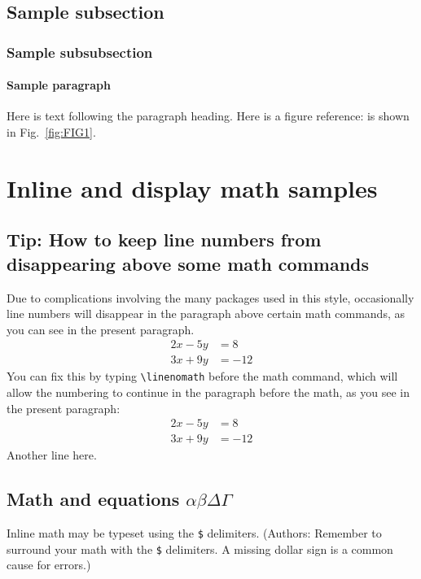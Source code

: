 \documentclass[preprint]{JASA}
\begin{document}
\subsection{\label{subsec:2:1} Sample subsection}

\subsubsection{Sample subsubsection\label{subsubsec:1}}

\paragraph{Sample paragraph}Here is text following the paragraph
heading.
Here is a figure reference: is shown in Fig.~\ref{fig:FIG1}.


\newpage

\section{Inline and display math samples\label{sec:3}}
\subsection{Tip: How to keep line numbers from disappearing above some math commands}
Due to complications involving the many packages used in this style,
occasionally line numbers will disappear in the paragraph above
certain math commands, as you can see in the present paragraph.
\begin{align} 
 2x - 5y &=  8 \\ 
 3x + 9y &=  -12
\end{align}
You can fix this by typing \verb+\linenomath+ before the math command,
which will allow the numbering to continue in the paragraph before the
math, as you see in the present paragraph:
\linenomath
\begin{align} 
 2x - 5y &=  8 \\ 
 3x + 9y &=  -12
\end{align}
Another line here.

\subsection{\label{subsec:3:3} Math and equations $\alpha\beta\Delta\Gamma$}
Inline math may be typeset using the \verb+$+ delimiters. (Authors:
Remember to surround your math with the \verb+$+ delimiters.  A missing dollar sign is a common cause for errors.)
\end{document}

